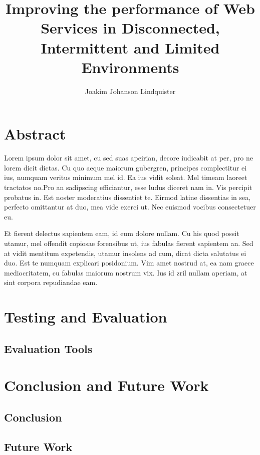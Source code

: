 \documentclass[USenglish]{ifimaster}
\title{Improving the performance of Web Services in Disconnected, Intermittent
and Limited Environments}
\author{Joakim Johanson Lindquister}
\begin{document}
\ififorside{}

\chapter*{Abstract}

Lorem ipsum dolor sit amet, cu sed suas apeirian, decore iudicabit at per, pro
ne lorem dicit dictas. Cu quo aeque maiorum gubergren, principes complectitur ei
ius, numquam veritus minimum mel id. Ea ius vidit soleat. Mel timeam laoreet
tractatos no.Pro an sadipscing efficiantur, esse ludus diceret nam in. Vis
percipit probatus in. Est noster moderatius dissentiet te. Eirmod latine
dissentias in sea, perfecto omittantur at duo, mea vide exerci ut. Nec euismod
vocibus consectetuer eu.

Et fierent delectus sapientem eam, id eum dolore nullam. Cu his quod possit
utamur, mel offendit copiosae forensibus ut, ius fabulas fierent sapientem an.
Sed at vidit mentitum expetendis, utamur insolens ad cum, dicat dicta salutatus
ei duo. Est te numquam explicari posidonium. Vim amet nostrud at, ea nam graece
mediocritatem, cu fabulas maiorum nostrum vix. Ius id zril nullam aperiam, at
sint corpora repudiandae eam.

\tableofcontents
\listoftables
\listoffigures

\pagebreak







\chapter{Testing and Evaluation}
\section{Evaluation Tools}

\chapter{Conclusion and Future Work}
\section{Conclusion}

\section{Future Work}

\pagebreak
\printbibliography{}
\printglossaries{}
\end{document}
